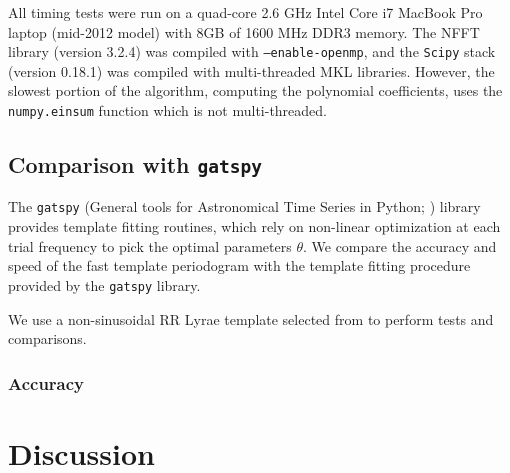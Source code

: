 \documentclass[iop]{emulateapj}
\begin{document}
All timing tests were run on a quad-core 2.6 GHz Intel Core i7 MacBook 
Pro laptop (mid-2012 model) with 8GB of 1600 MHz DDR3 memory. The NFFT
library (version 3.2.4) was compiled with \texttt{--enable-openmp}, and
the \texttt{Scipy} stack (version 0.18.1) was compiled with multi-threaded MKL libraries.
However, the slowest portion of the algorithm, computing the polynomial
coefficients, uses the \texttt{numpy.einsum} function which is not
multi-threaded. 

\subsection{Comparison with \texttt{gatspy}}

The \texttt{gatspy} (General tools for Astronomical Time Series in Python; 
\cite{gatspy,Vanderplas+Ivezic_2015}) library provides template fitting
routines, which rely on non-linear optimization at each trial frequency
to pick the optimal parameters $\theta$. We compare the accuracy and
speed of the fast template periodogram with the template fitting
procedure provided by the \texttt{gatspy} library.

We use a non-sinusoidal RR Lyrae template selected from \cite{Sesar_etal_2010} to perform tests and comparisons.


\subsubsection{Accuracy}








\section{Discussion}









\end{document}
